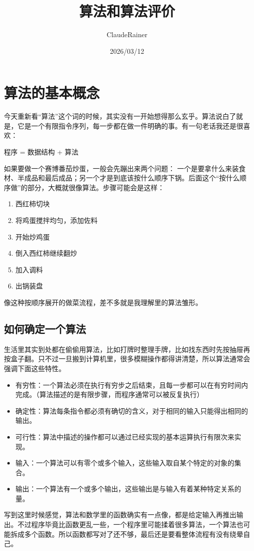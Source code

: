 \documentclass[b5paper,11pt]{article}
\title{算法和算法评价}
\author{ClaudeRainer}
\date{2026/03/12}
\begin{document}
\maketitle

\section{算法的基本概念}
今天重新看“算法”这个词的时候，其实没有一开始想得那么玄乎。算法说白了就是，它是一个有限指令序列，每一步都在做一件明确的事。有一句老话我还是很喜欢：
\begin{cquote}
  程序 = 数据结构 + 算法
\end{cquote}

如果要做一个赛博番茄炒蛋，一般会先蹦出来两个问题：
一个是要拿什么来装食材、半成品和最后成品；另一个才是到底该按什么顺序下锅。后面这个“按什么顺序做”的部分，大概就很像算法。步骤可能会是这样：
\begin{enumerate}
  \item 西红柿切块
  \item 将鸡蛋搅拌均匀，添加佐料
  \item 开始炒鸡蛋
  \item 倒入西红柿继续翻炒
  \item 加入调料
  \item 出锅装盘
\end{enumerate}
像这种按顺序展开的做菜流程，差不多就是我理解里的算法雏形。

\subsection{如何确定一个算法}
生活里其实到处都在偷偷用算法，比如打牌时整理手牌，比如找东西时先按抽屉再按盒子翻。只不过一旦搬到计算机里，很多模糊操作都得讲清楚，所以算法通常会强调下面这些特性。
\begin{itemize}
  \item 有穷性：一个算法必须在执行有穷步之后结束，且每一步都可以在有穷时间内完成。（算法描述的是有限步骤，而程序通常可以被反复执行）
  \item 确定性：算法每条指令都必须有确切的含义，对于相同的输入只能得出相同的输出。
  \item 可行性：算法中描述的操作都可以通过已经实现的基本运算执行有限次来实现。
  \item 输入：一个算法可以有零个或多个输入，这些输入取自某个特定的对象的集合。
  \item 输出：一个算法有一个或多个输出，这些输出是与输入有着某种特定关系的量。
\end{itemize}
写到这里时候感觉，算法和数学里的函数确实有一点像，都是给定输入再推出输出。不过程序毕竟比函数更乱一些，一个程序里可能揉着很多算法，一个算法也可能拆成多个函数。所以函数都写对了还不够，最后还是要看整体流程有没有绕晕自己。
\end{document}
